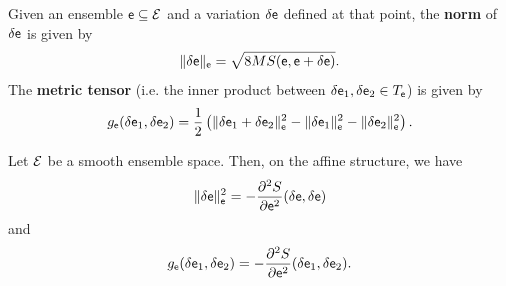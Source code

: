 \begin{mathSection}
\begin{defn}
	Given an ensemble $\mathsf{e} \subseteq \mathcal{E}$ and a variation $\delta \mathsf{e}$ defined at that point, the \textbf{norm} of $\delta \mathsf{e}$ is given by
	$$ \lVert \delta \mathsf{e} \rVert_{\mathsf{e}} = \sqrt{ 8 MS(\mathsf{e}, \mathsf{e} + \delta \mathsf{e}) }.$$
	The \textbf{metric tensor} (i.e. the inner product between $\delta \mathsf{e}_1 , \delta \mathsf{e}_2 \in T_{\mathsf{e}}$) is given by
	$$ g_{\mathsf{e}}( \delta \mathsf{e}_1, \delta \mathsf{e}_2 ) = \frac{1}{2} \left( \lVert \delta \mathsf{e}_1 + \delta \mathsf{e}_2 \rVert_{\mathsf{e}}^2 - \lVert \delta \mathsf{e}_1 \rVert_{\mathsf{e}}^2 - \lVert \delta \mathsf{e}_2 \rVert_{\mathsf{e}}^2 \right).$$
\end{defn}

\begin{thrm}
	Let $\mathcal{E}$ be a smooth ensemble space. Then, on the affine structure, we have
	$$ \lVert \delta \mathsf{e} \rVert_{\mathsf{e}}^2 = - \frac{\partial^2 S}{\partial \mathsf{e}^2}(\delta \mathsf{e} , \delta \mathsf{e}) $$
	and 
	$$ g_{\mathsf{e}}( \delta \mathsf{e}_1, \delta \mathsf{e}_2 ) = - \frac{\partial^2 S}{\partial \mathsf{e} ^2}( \delta \mathsf{e}_1, \delta \mathsf{e}_2 ).$$
\end{thrm}


\end{mathSection}
